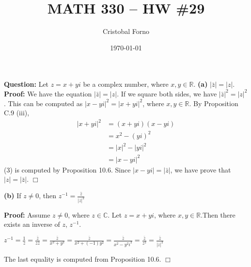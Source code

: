 \documentclass[12pt]{article}
\title{MATH 330 -- HW \#29}
\author{Cristobal Forno}
\date{\today}
\begin{document}
\maketitle

\textbf{Question:} Let $z = x + yi$ be a complex number, where $x, y \in
\mathbb{R}$.
\newline
\textbf{(a)} $|\bar{z}| = |z|$.
\newline
\indent
\textbf{Proof:} We have the equation $|\bar{z}| = |z|$. If we square both sides,
we have $|\bar{z}|^2 = |z|^2$. This can be computed as $|x-yi|^2 = |x+yi|^2$,
where $x, y \in \mathbb{R}$. By Proposition C.9 (iii),
\begin{align}
  |x+yi|^2 &= (x+yi)(x-yi) \\
           &= x^2-(yi)^2 \\
           &= |x|^2 - |yi|^2 \\ 
           &= |x-yi|^2
\end{align}
(3) is computed by Proposition 10.6. Since $|x-yi| = |\bar{z}|$, we have prove
that $|z| = |\bar{z}|$. $\Box$


\noindent
\textbf{(b)} If $z \neq 0$, then $z^{-1} = \frac{\bar{z}}{|z|^2}$

\textbf{Proof:} Assume $z \neq 0$, where $z \in \mathbb{C}$. Let $z = x + yi$,
where $x, y \in \mathbb{R}$.Then there exists
an inverse of $z$, $z^{-1}$.
\begin{center}
$z^{-1} = \frac{1}{z} = \frac{\bar{z}}{z\bar{z}} = \frac{\bar{z}}{x^2+y^2} =
\frac{\bar{z}}{x^2 +(-1)y^2} =  \frac{\bar{z}}{x^2- y^2i^2} =
\frac{\bar{z}}{z^2} = \frac{\bar{z}}{|z|^2}$
\end{center}

The last equality is computed from Proposition 10.6. $\Box$
\end{document}

